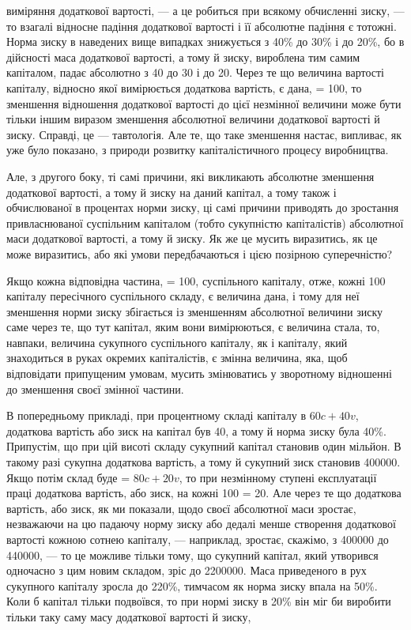 \parcont{}  %
виміряння додаткової вартості, — а це робиться при всякому
обчисленні зиску, — то взагалі відносне падіння додаткової вартості
і її абсолютне падіння є тотожні. Норма зиску в наведених
вище випадках знижується з 40\% до 30\% і до 20\%, бо в дійсності
маса додаткової вартості, а тому й зиску, вироблена тим
самим капіталом, падає абсолютно з 40 до 30 і до 20. Через те
що величина вартості капіталу, відносно якої вимірюється додаткова
вартість, є дана, = 100, то зменшення відношення додаткової
вартості до цієї незмінної величини може бути тільки іншим
виразом зменшення абсолютної величини додаткової вартості
й зиску. Справді, це — тавтологія. Але те, що таке зменшення
настає, випливає, як уже було показано, з природи розвитку
капіталістичного процесу виробництва.

Але, з другого боку, ті самі причини, які викликають абсолютне
зменшення додаткової вартості, а тому й зиску на даний
капітал, а тому також і обчислюваної в процентах норми зиску,
ці самі причини приводять до зростання привласнюваної суспільним
капіталом (тобто сукупністю капіталістів) абсолютної маси
додаткової вартості, а тому й зиску. Як же це мусить виразитись,
як це може виразитись, або які умови передбачаються
і цією позірною суперечністю?

Якщо кожна відповідна частина, = 100, суспільного капіталу,
отже, кожні 100 капіталу пересічного суспільного складу, є величина
дана, і тому для неї зменшення норми зиску збігається
із зменшенням абсолютної величини зиску саме через те, що
тут капітал, яким вони вимірюються, є величина стала, то,
навпаки, величина сукупного суспільного капіталу, як і капіталу,
який знаходиться в руках окремих капіталістів, є змінна
величина, яка, щоб відповідати припущеним умовам, мусить
змінюватись у зворотному відношенні до зменшення своєї змінної
частини.

В попередньому прикладі, при процентному складі капіталу
в $60c + 40v$, додаткова вартість або зиск на капітал був 40,
а тому й норма зиску була 40\%. Припустім, що при цій висоті
складу сукупний капітал становив один мільйон. В такому разі
сукупна додаткова вартість, а тому й сукупний зиск становив
\num{400000}. Якщо потім склад буде = $80c + 20v$, то при незмінному
ступені експлуатації праці додаткова вартість, або зиск, на кожні
100 = 20. Але через те що додаткова вартість, або зиск, як ми
показали, щодо своєї абсолютної маси зростає, незважаючи на цю
падаючу норму зиску або дедалі менше створення додаткової
вартості кожною сотнею капіталу, — наприклад, зростає, скажімо,
з \num{400000} до \num{440000}, — то це можливе тільки тому, що сукупний
капітал, який утворився одночасно з цим новим складом, зріс
до \num{2200000}. Маса приведеного в рух сукупного капіталу зросла
до 220\%, тимчасом як норма зиску впала на 50\%. Коли б капітал
тільки подвоївся, то при нормі зиску в 20\% він міг би
виробити тільки таку саму масу додаткової вартості й зиску,
\parbreak{}  %
